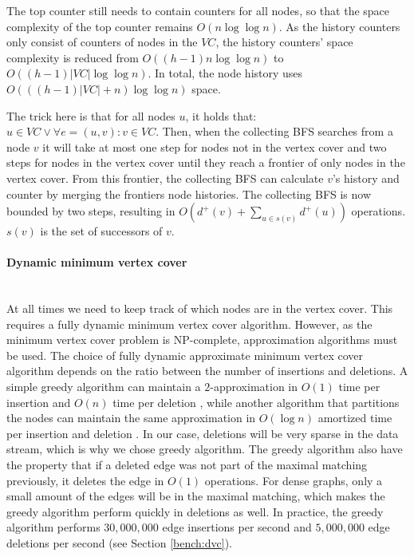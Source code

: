 The top counter still needs to contain counters for all nodes, so that the space complexity of the top counter remains $O(n\log \log n)$. As the history counters only consist of counters of nodes in the $VC$, the history counters' space complexity is reduced from $O((h-1)n \log \log n)$ to $O((h-1)|VC| \log \log n)$. In total, the node history uses $O(((h-1)|VC| + n )\log \log n)$ space.

The trick here is that for all nodes $u$, it holds that: $u \in VC \vee \forall e = (u,v) : v \in VC$. Then, when the collecting BFS searches from a node $v$ it will take at most one step for nodes not in the vertex cover and two steps for nodes in the vertex cover until they reach a frontier of only nodes in the vertex cover. From this frontier, the collecting BFS can calculate $v$'s history and counter by merging the frontiers node histories. The collecting BFS is now bounded by two steps, resulting in $O(d^+(v) + \sum_{u \in s(v)}{d^+(u)})$ operations. $s(v)$ is the set of successors of $v$.

\paragraph{Dynamic minimum vertex cover} \mbox{} \\
At all times we need to keep track of which nodes are in the vertex cover. This requires a fully dynamic minimum vertex cover algorithm. However, as the minimum vertex cover problem is NP-complete, approximation algorithms must be used. The choice of fully dynamic approximate minimum vertex cover algorithm depends on the ratio between the number of insertions and deletions. A simple greedy algorithm can maintain a $2$-approximation in $O(1)$ time per insertion and $O(n)$ time per deletion \cite{2appdynvc}, while another algorithm that partitions the nodes can maintain the same approximation in $O(\log n )$ amortized time per insertion and deletion \cite{2appdynvclogn}. In our case, deletions will be very sparse in the data stream, which is why we chose greedy algorithm. The greedy algorithm also have the property that if a deleted edge was not part of the maximal matching previously, it deletes the edge in $O(1)$ operations. For dense graphs, only a small amount of the edges will be in the maximal matching, which makes the greedy algorithm perform quickly in deletions as well. In practice, the greedy algorithm performs $30,000,000$ edge insertions per second and $5,000,000$ edge deletions per second (see Section \ref{bench:dvc}).
 
